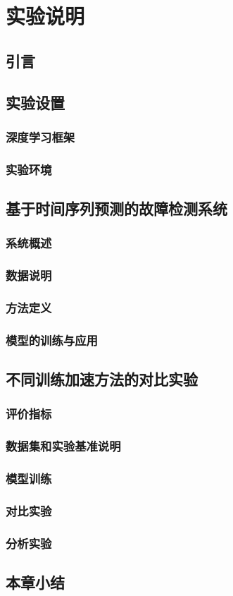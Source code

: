 

\chapter{实验说明}

\section{引言}
\section{实验设置}
\subsection{深度学习框架}
\subsection{实验环境}

\section{基于时间序列预测的故障检测系统}
\subsection{系统概述}
\subsection{数据说明}
\subsection{方法定义}
\subsection{模型的训练与应用}

\section{不同训练加速方法的对比实验}
\subsection{评价指标}
\subsection{数据集和实验基准说明}
\subsection{模型训练}
\subsection{对比实验}
\subsection{分析实验}

\section{本章小结}


